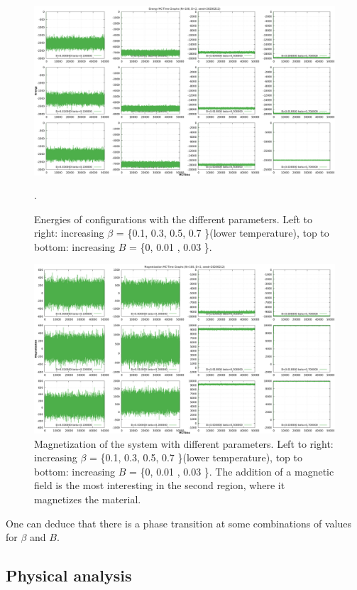 \documentclass[11pt,a4paper]{article}
\begin{document}
\begin{figure}
\centering
\includegraphics[scale=0.35]{all_energy.png}
\caption{Energies of configurations with the different parameters. Left to right: increasing $\beta$ = \{0.1, 0.3, 0.5, 0.7 \}(lower temperature), top to bottom: increasing $B$ = \{0, 0.01 , 0.03 \}.}.
\label{fig:foo2}
\end{figure}

\begin{figure}
\centering
\includegraphics[scale=0.35]{all_magnet.png}
\caption{Magnetization of the system with different parameters. Left to right: increasing $\beta$ = \{0.1, 0.3, 0.5, 0.7 \}(lower temperature), top to bottom: increasing $B$ = \{0, 0.01 , 0.03 \}. The addition of a magnetic field is the most interesting in the second region, where it magnetizes the material.}
\label{fig:foo3}
\end{figure}
One can deduce that there is a phase transition at some combinations of values for $\beta$ and $B$.

\subsection{Physical analysis}
\end{document}
